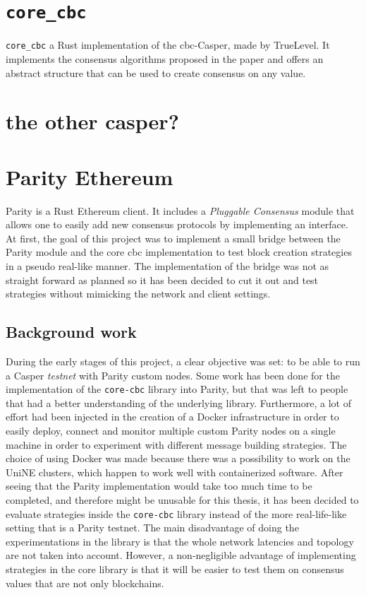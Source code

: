 \section{\texttt{core\_cbc}}
\texttt{core\_cbc} a Rust implementation of the \gls{cbc}-Casper, made by
TrueLevel. It implements the consensus algorithms proposed in the paper and
offers an abstract structure that can be used to create consensus on any value.

\section{the other casper?}
\section{Parity Ethereum}
Parity is a Rust Ethereum client. It includes a \textit{Pluggable Consensus}
module that allows one to easily add new consensus protocols by implementing an
interface.  At first, the goal of this project was to implement a small bridge
between the Parity module and the core cbc implementation to test block creation
strategies in a pseudo real-like manner. The implementation of the bridge was
not as straight forward as planned so it has been decided to cut it out and test
strategies without mimicking the network and client settings.

\subsection{Background work}
During the early stages of this project, a clear objective was set: to be able
to run a Casper \textit{testnet} with Parity custom nodes. Some work has been
done for the implementation of the \texttt{core-cbc} library into Parity, but
that was left to people that had a better understanding of the underlying
library. Furthermore,  a lot of effort had been
injected in the creation of a Docker infrastructure in order to easily deploy,
connect and monitor multiple custom Parity nodes on a single machine in order to
experiment with different message building strategies. The choice of using
Docker was made because there was a  possibility to work on the UniNE
clusters, which happen to work well with containerized software. After seeing
that the Parity implementation would take too much time to be completed, and
therefore might be unusable for this thesis, it has been decided to evaluate
strategies inside the \texttt{core-cbc} library instead of the more
real-life-like setting that is a Parity testnet. The main disadvantage of doing
the experimentations in the library is that the whole network latencies and
topology are not taken into account. However, a non-negligible advantage of
implementing strategies in the core library is that it will be easier to test
them on consensus values that are not only blockchains.

